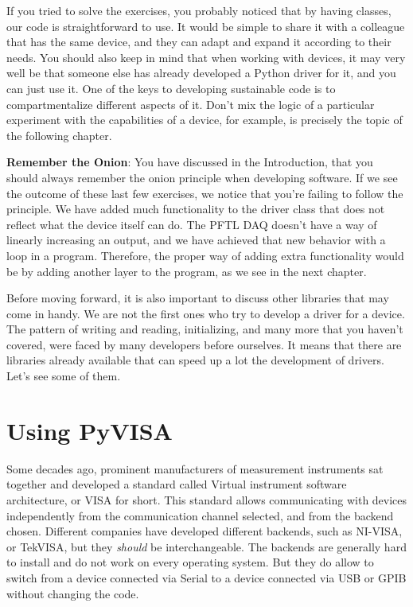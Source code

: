 

If you tried to solve the exercises, you probably noticed that by having classes, our code is straightforward to use. It would be simple to share it with a colleague that has the same device, and they can adapt and expand it according to their needs. You should also keep in mind that when working with devices, it may very well be that someone else has already developed a Python driver for it, and you can just use it. One of the keys to developing sustainable code is to compartmentalize different aspects of it. Don't mix the logic of a particular experiment with the capabilities of a device, for example, is precisely the topic of the following chapter.

\textbf{Remember the Onion}: You have discussed in the Introduction, that you should always remember the onion principle when developing software. If we see the outcome of these last few exercises, we notice that you're failing to follow the principle. We have added much functionality to the driver class that does not reflect what the device itself can do. The {PFTL DAQ} doesn't have a way of linearly increasing an output, and we have achieved that new behavior with a loop in a program. Therefore, the proper way of adding extra functionality would be by adding another layer to the program, as we see in the next chapter.

Before moving forward, it is also important to discuss other libraries that may come in handy. We are not the first ones who try to develop a driver for a device. The pattern of writing and reading, initializing, and many more that you haven't covered, were faced by many developers before ourselves. It means that there are libraries already available that can speed up a lot the development of drivers. Let's see some of them.

\section{Using PyVISA}\label{sec:pyvisa}
Some decades ago, prominent manufacturers of measurement instruments sat together and developed a standard called Virtual instrument software architecture, or VISA for short. This standard allows communicating with devices independently from the communication channel selected, and from the backend chosen. Different companies have developed different backends, such as NI-VISA, or TekVISA, but they \emph{should} be interchangeable. The backends are generally hard to install and do not work on every operating system. But they do allow to switch from a device connected via Serial to a device connected via USB or GPIB without changing the code.

